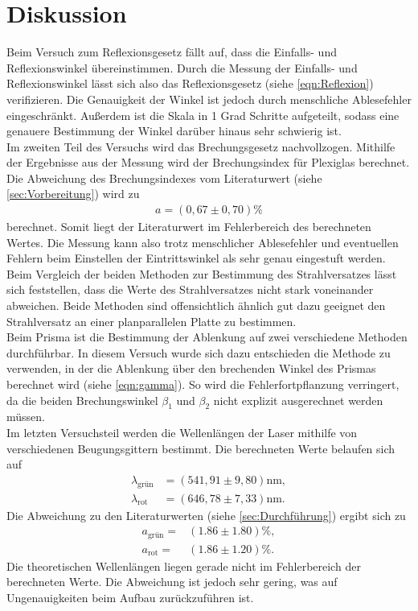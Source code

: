 \section{Diskussion}
\label{sec:Diskussion}

Beim Versuch zum Reflexionsgesetz fällt auf, dass die Einfalls- und Reflexionswinkel übereinstimmen.
Durch die Messung der Einfalls- und Reflexionswinkel lässt sich also das Reflexionsgesetz (siehe \autoref{eqn:Reflexion}) verifizieren.
Die Genauigkeit der Winkel ist jedoch durch menschliche Ablesefehler eingeschränkt. Außerdem ist die Skala in 1 Grad Schritte aufgeteilt,
sodass eine genauere Bestimmung der Winkel darüber hinaus sehr schwierig ist.\\


Im zweiten Teil des Versuchs wird das Brechungsgesetz nachvollzogen. Mithilfe der Ergebnisse aus der Messung wird der Brechungsindex
für Plexiglas berechnet. 
Die Abweichung des Brechungsindexes vom Literaturwert (siehe \autoref{sec:Vorbereitung}) wird zu
\begin{align*}
  a=(0,67 \pm 0,70) \si{\percent}
\end{align*}
berechnet. Somit liegt der Literaturwert im Fehlerbereich des berechneten Wertes. Die Messung kann also trotz menschlicher Ablesefehler
und eventuellen Fehlern beim Einstellen der Eintrittswinkel als sehr genau eingestuft werden.\\

Beim Vergleich der beiden Methoden zur Bestimmung des Strahlversatzes lässt sich feststellen, dass die Werte des
Strahlversatzes nicht stark voneinander abweichen. Beide Methoden sind offensichtlich ähnlich gut dazu geeignet den Strahlversatz 
an einer planparallelen Platte zu bestimmen.\\


Beim Prisma ist die Bestimmung der Ablenkung auf zwei verschiedene Methoden durchführbar.
In diesem Versuch wurde sich dazu entschieden die Methode zu verwenden,
in der die Ablenkung über den brechenden Winkel des Prismas berechnet wird (siehe \autoref{eqn:gamma}).
So wird die Fehlerfortpflanzung verringert, da die beiden Brechungswinkel $\beta_1$ und $\beta_2$ nicht
explizit ausgerechnet werden müssen.\\

Im letzten Versuchsteil werden die Wellenlängen der Laser mithilfe von verschiedenen Beugungsgittern bestimmt.
Die berechneten Werte belaufen sich auf
\begin{align*}
    \lambda_{\text{grün}} &= (541,91 \pm 9,80) \si{\nano\meter},\\
    \lambda_{\text{rot}} &= (646,78 \pm 7,33) \si{\nano\meter}.
\end{align*}
Die Abweichung zu den Literaturwerten (siehe \autoref{sec:Durchführung}) ergibt sich zu
\begin{align*}
    a_{\text{grün}}=& (1.86\pm 1.80) \si{\percent},\\
    a_{\text{rot}}=& (1.86 \pm 1.20) \si{\percent}.
\end{align*}
Die theoretischen Wellenlängen liegen gerade nicht im Fehlerbereich der berechneten Werte. Die Abweichung ist jedoch sehr gering,
was auf Ungenauigkeiten beim Aufbau zurückzuführen ist.





